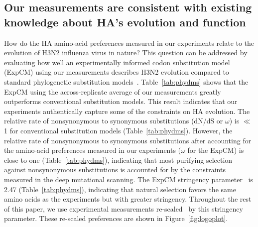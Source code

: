 \documentclass[9pt,twocolumn,twoside]{pnas-new}
\begin{document}
\subsection*{Our measurements are consistent with existing knowledge about HA's evolution and function}
How do the HA amino-acid preferences measured in our experiments relate to the evolution of H3N2 influenza virus in nature?
This question can be addressed by evaluating how well an experimentally informed codon substitution model (ExpCM) using our measurements describes H3N2 evolution compared to standard phylogenetic substitution models~\cite{bloom2017identification,hilton2017phydms}.
Table~\ref{tab:phydms} shows that the ExpCM using the across-replicate average of our measurements greatly outperforms conventional substitution models.
This result indicates that our experiments authentically capture some of the constraints on HA evolution.
The relative rate of nonsynonymous to synonymous substitutions (dN/dS or $\omega$) is $\ll$1 for conventional substitution models (Table~\ref{tab:phydms}).
However, the relative rate of nonsynonymous to synonymous substitutions after accounting for the amino-acid preferences measured in our experiments ($\omega$ for the ExpCM) is close to one (Table~\ref{tab:phydms}), indicating that most purifying selection against nonsynonymous substitutions is accounted for by the constraints measured in the deep mutational scanning.
The ExpCM stringency parameter~\cite{hilton2017phydms} is 2.47 (Table~\ref{tab:phydms}), indicating that natural selection favors the same amino acids as the experiments but with greater stringency.
Throughout the rest of this paper, we use experimental measurements re-scaled~\cite{bloom2017identification,hilton2017phydms} by this stringency parameter.
These re-scaled preferences are shown in Figure~\ref{fig:logoplot}.
\end{document}
